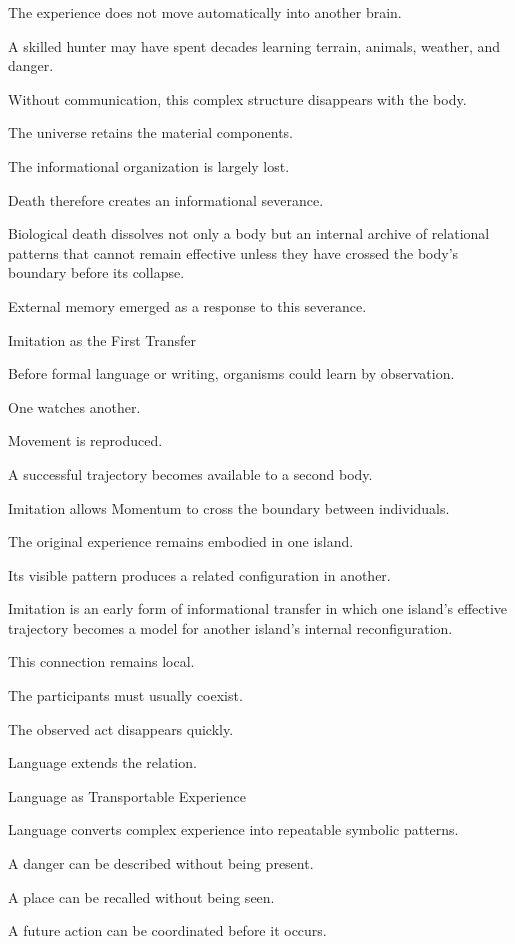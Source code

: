 The experience does not move automatically into another brain.

A skilled hunter may have spent decades learning terrain, animals, weather, and danger.

Without communication, this complex structure disappears with the body.

The universe retains the material components.

The informational organization is largely lost.

Death therefore creates an informational severance.

Biological death dissolves not only a body but an internal archive of relational patterns that cannot remain effective unless they have crossed the body’s boundary before its collapse.

External memory emerged as a response to this severance.

Imitation as the First Transfer

Before formal language or writing, organisms could learn by observation.

One watches another.

Movement is reproduced.

A successful trajectory becomes available to a second body.

Imitation allows Momentum to cross the boundary between individuals.

The original experience remains embodied in one island.

Its visible pattern produces a related configuration in another.

Imitation is an early form of informational transfer in which one island’s effective trajectory becomes a model for another island’s internal reconfiguration.

This connection remains local.

The participants must usually coexist.

The observed act disappears quickly.

Language extends the relation.

Language as Transportable Experience

Language converts complex experience into repeatable symbolic patterns.

A danger can be described without being present.

A place can be recalled without being seen.

A future action can be coordinated before it occurs.


